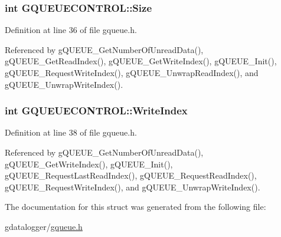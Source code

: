 \hypertarget{structGQUEUECONTROL_a4db75bcca77dbc6ea7d8d5c3cd3a365f}{
\subsubsection[{Size}]{\setlength{\rightskip}{0pt plus 5cm}int G\-Q\-U\-E\-U\-E\-C\-O\-N\-T\-R\-O\-L\-::\-Size}}\label{structGQUEUECONTROL_a4db75bcca77dbc6ea7d8d5c3cd3a365f}


Definition at line 36 of file gqueue.\-h.



Referenced by g\-Q\-U\-E\-U\-E\-\_\-\-Get\-Number\-Of\-Unread\-Data(), g\-Q\-U\-E\-U\-E\-\_\-\-Get\-Read\-Index(), g\-Q\-U\-E\-U\-E\-\_\-\-Get\-Write\-Index(), g\-Q\-U\-E\-U\-E\-\_\-\-Init(), g\-Q\-U\-E\-U\-E\-\_\-\-Request\-Write\-Index(), g\-Q\-U\-E\-U\-E\-\_\-\-Unwrap\-Read\-Index(), and g\-Q\-U\-E\-U\-E\-\_\-\-Unwrap\-Write\-Index().

\hypertarget{structGQUEUECONTROL_a614237a6b5ee3fca394e40a0274d5b43}{
\subsubsection[{Write\-Index}]{\setlength{\rightskip}{0pt plus 5cm}int G\-Q\-U\-E\-U\-E\-C\-O\-N\-T\-R\-O\-L\-::\-Write\-Index}}\label{structGQUEUECONTROL_a614237a6b5ee3fca394e40a0274d5b43}


Definition at line 38 of file gqueue.\-h.



Referenced by g\-Q\-U\-E\-U\-E\-\_\-\-Get\-Number\-Of\-Unread\-Data(), g\-Q\-U\-E\-U\-E\-\_\-\-Get\-Write\-Index(), g\-Q\-U\-E\-U\-E\-\_\-\-Init(), g\-Q\-U\-E\-U\-E\-\_\-\-Request\-Last\-Read\-Index(), g\-Q\-U\-E\-U\-E\-\_\-\-Request\-Read\-Index(), g\-Q\-U\-E\-U\-E\-\_\-\-Request\-Write\-Index(), and g\-Q\-U\-E\-U\-E\-\_\-\-Unwrap\-Write\-Index().



The documentation for this struct was generated from the following file\-:\begin{DoxyCompactItemize}
\item 
gdatalogger/\hyperlink{gqueue_8h}{gqueue.\-h}\end{DoxyCompactItemize}

